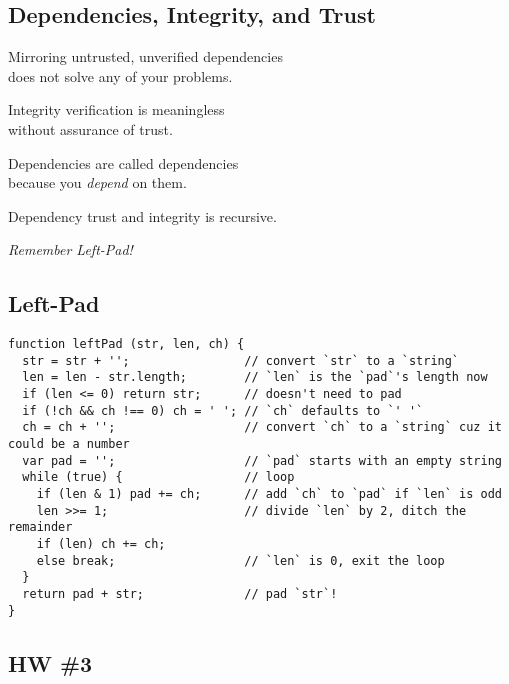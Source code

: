\documentclass[xga]{xdvislides}
\begin{document}
\subsection{Dependencies, Integrity, and Trust}
\begin{center}
Mirroring untrusted, unverified dependencies\\
does not solve any of your problems. \\
\vspace{.5in}

Integrity verification is meaningless \\
without assurance of trust. \\
\vspace{.5in}

Dependencies are called dependencies \\
because you {\em depend} on them. \\
\vspace{.5in}

Dependency trust and integrity is recursive. \\
\vspace{.5in}

{\em Remember Left-Pad!}
\end{center}

\subsection{Left-Pad}
\begin{verbatim}
function leftPad (str, len, ch) {
  str = str + '';                // convert `str` to a `string`
  len = len - str.length;        // `len` is the `pad`'s length now
  if (len <= 0) return str;      // doesn't need to pad 
  if (!ch && ch !== 0) ch = ' '; // `ch` defaults to `' '`
  ch = ch + '';                  // convert `ch` to a `string` cuz it could be a number
  var pad = '';                  // `pad` starts with an empty string
  while (true) {                 // loop
    if (len & 1) pad += ch;      // add `ch` to `pad` if `len` is odd
    len >>= 1;                   // divide `len` by 2, ditch the remainder
    if (len) ch += ch;
    else break;                  // `len` is 0, exit the loop
  }
  return pad + str;              // pad `str`!
}
\end{verbatim}

\subsection{HW \#3}
\end{document}
